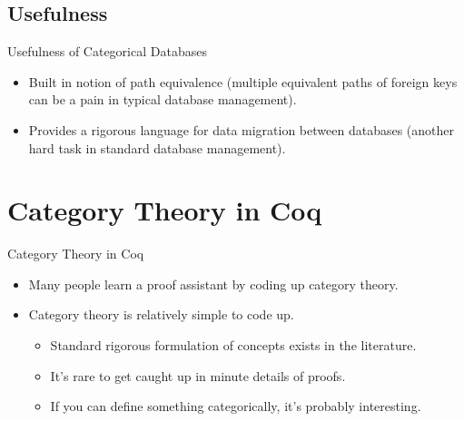 \documentclass[utf8x]{beamer}
\begin{document}
  \subsection{Usefulness}
    \begin{frame}{Usefulness of Categorical Databases}
      \begin{itemize}
        \item
          Built in notion of path equivalence (multiple equivalent paths of foreign keys can be a pain in typical database management). \pause
        \item
          Provides a rigorous language for data migration between databases (another hard task in standard database management).
      \end{itemize}
    \end{frame}
  
\section{Category Theory in Coq}
  
  \begin{frame}{Category Theory in Coq}
    \begin{itemize}
      \item
        Many people learn a proof assistant by coding up category theory. \pause
      \item
        Category theory is relatively simple to code up. \pause
        \begin{itemize}
          \item
            Standard rigorous formulation of concepts exists in the literature. \pause
          \item
            It's rare to get caught up in minute details of proofs. \pause
          \item
            If you can define something categorically, it's probably interesting.
        \end{itemize}
    \end{itemize}
  \end{frame}
  
\end{document}
